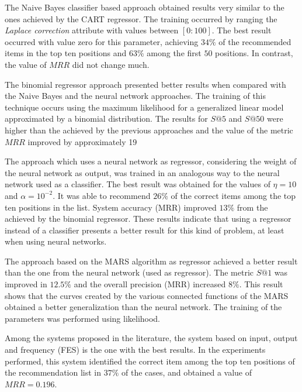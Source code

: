 \documentclass[10pt,letterpaper]{article}
\begin{document}
The Naive Bayes classifier based approach obtained results very similar to the ones achieved by the CART regressor. The training occurred by ranging the \emph{Laplace correction} attribute with values ​​between \([0:100]\). The best result occurred with value zero for this parameter, achieving \(34\%\) of the recommended items in the top ten positions and \(63\%\) among the first \(50\) positions. In contrast, the value of \(MRR\) did not change much.

The binomial regressor approach presented better results when compared with the Naive Bayes and the neural network approaches. The training of this technique occurs using the maximum likelihood for a generalized linear model approximated by a binomial distribution. The results for \(S@5\) and \(S@50\) were higher than the achieved by the previous approaches and the value of the metric \(MRR\) improved by approximately 19%

The approach which uses a neural network as regressor, considering the weight of the neural network as output, was trained in an analogous way to the neural network used as a classifier. The best result was obtained for the values ​​of \(\eta = 10\) and \(\alpha = 10^{-2}\). It was able to recommend \(26\%\) of the correct items among the top ten positions in the list. System accuracy (MRR) improved \(13\%\) from the achieved by the binomial regressor. These results indicate that using a regressor instead of a classifier presents a better result for this kind of problem, at least when using neural networks.

The approach based on the MARS algorithm as regressor achieved a better result than the one from the neural network (used as regressor). The metric \(S@1\) was improved in \(12.5\%\) and the overall precision (MRR) increased  \(8\%\). This result shows that the curves created by the various connected functions of the MARS obtained a better generalization than the neural network. The training of the parameters was performed using likelihood.

Among the systems proposed in the literature, the system based on input, output and frequency (FES) \cite{Wang2008} is the one with the best results. In the experiments performed, this system identified the correct item among the top ten positions of the recommendation list in \(37\%\) of the cases, and obtained a value of \(MRR = 0.196\).
\end{document}
